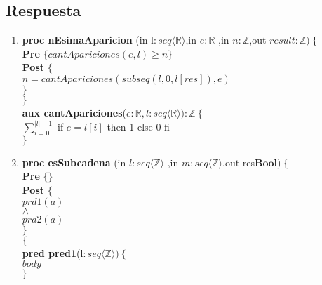 \documentclass[a4paper]{article}
\begin{document}
\subsection*{Respuesta}
	\begin{enumerate}[label=\alph*)]
		\item
			
			\textbf{proc nEsimaAparicion }(in l$:seq\langle \mathbb{R}\rangle$,in $e:\mathbb{R}$
			,in $n:\mathbb{Z}$,out $result:\mathbb{Z})\ \{$\smallskip \\
			\hspace*{6mm} \textbf{Pre }$\{ cantApariciones(e,l)\geq n\}$\smallskip \\
			\hspace*{6mm} \textbf{Post }$\{$\\
			\hspace*{6mm} $n=cantApariciones(subseq(l,0,l[res]),e)$\\
			\hspace*{6mm} $\}$\\
			$\}$\smallskip \\
			
			\textbf{aux cantApariciones}($e:\mathbb{R},l: seq\langle \mathbb{R}\rangle):\mathbb{Z}
			\ \{$\smallskip \\
			\hspace*{6mm}$\sum_{i=0}^{|l|-1}$ if $e=l[i]$ then 1 else 0 fi\\
			$\}$			
			
		\item
			
			\textbf{proc esSubcadena }(in $l:seq\langle \mathbb{Z}\rangle$
				,in $m:seq\langle \mathbb{Z}\rangle$,out res$\textbf{Bool} )\ \{$\smallskip \\
			\hspace*{6mm} \textbf{Pre }$\{ \}$\smallskip \\
			\hspace*{6mm} \textbf{Post }$\{$\\
			\hspace*{6mm} $prd1(a)$\\
			\hspace*{6mm} $\wedge$\\
			\hspace*{6mm} $prd2(a)$\\
			\hspace*{6mm} $\}$\\
			$\{$\smallskip \\
			
			\textbf{pred pred1}(l$: seq\langle \mathbb{Z}\rangle)\ \{$\smallskip \\
			\hspace*{6mm}$body$\\
			$\}$	
			

\end{enumerate}
\end{document}

